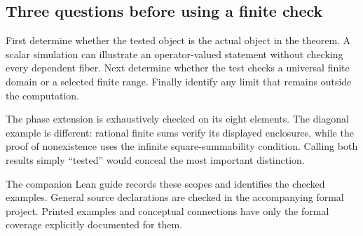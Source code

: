 \subsection{Three questions before using a finite check}
First determine whether the tested object is the actual object in the theorem. A scalar simulation can illustrate an operator-valued statement without checking every dependent fiber. Next determine whether the test checks a universal finite domain or a selected finite range. Finally identify any limit that remains outside the computation.

The phase extension is exhaustively checked on its eight elements. The diagonal example is different: rational finite sums verify its displayed enclosures, while the proof of nonexistence uses the infinite square-summability condition. Calling both results simply ``tested'' would conceal the most important distinction.

The companion Lean guide records these scopes and identifies the checked examples. General source declarations are checked in the accompanying formal project. Printed examples and conceptual connections have only the formal coverage explicitly documented for them.
